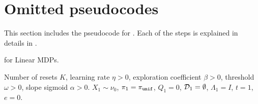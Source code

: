 \section{Omitted pseudocodes}
\label{app:pseudocodes}
This section includes the pseudocode for \algname.
Each of the steps is explained in details in .
\begin{algorithm}[!h]
\caption{\algname for Linear MDPs.}
  \begin{algorithmic}[1]
  \label{alg:linear-rmax-ravi-ucb}
       Number of resets $K$, learning rate $\eta > 0$, exploration coefficient $\beta > 0$, threshold $\omega > 0$, slope sigmoid $\alpha > 0$.
       $X_1 \sim \nu_0$, $\pi_1 = \pi_{\texttt{unif}}$, $Q_1 = 0$, $\mathcal{D}_1 = \emptyset$, $\Lambda_1 = I$, $t = 1$, $e = 0$.
        

\end{algorithmic}
\end{algorithm}
